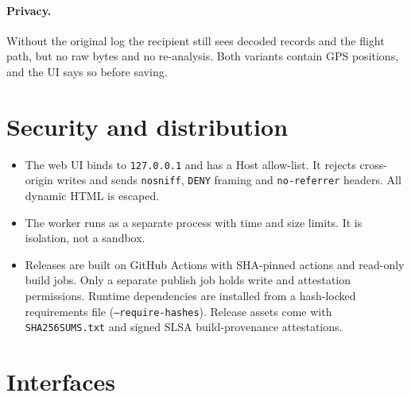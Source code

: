 \documentclass[11pt,a4paper]{article}
\newcommand{\code}[1]{\texttt{#1}}
\begin{document}
\paragraph{Privacy.} Without the original log the recipient still sees decoded records and the
flight path, but no raw bytes and no re-analysis. Both variants contain GPS positions, and the UI
says so before saving.

\section{Security and distribution}

\begin{itemize}
  \item The web UI binds to \code{127.0.0.1} and has a Host allow-list. It rejects cross-origin
        writes and sends \code{nosniff}, \code{DENY} framing and \code{no-referrer} headers. All
        dynamic HTML is escaped.
  \item The worker runs as a separate process with time and size limits. It is isolation, not a
        sandbox.
  \item Releases are built on GitHub Actions with SHA-pinned actions and read-only build jobs. Only
        a separate publish job holds write and attestation permissions. Runtime dependencies are
        installed from a hash-locked requirements file (\code{--require-hashes}). Release assets
        come with \code{SHA256SUMS.txt} and signed SLSA build-provenance attestations.
\end{itemize}

\section{Interfaces}
\end{document}
